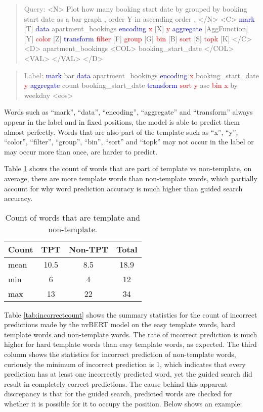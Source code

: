 \documentclass[
	a4paper, %
	10pt, %
	unnumberedsections, %
	twoside, %
]{t0003}
\newcommand{\blue}[1]{\textcolor{blue}{#1}}
\newcommand{\gray}[1]{\textcolor{gray}{#1}}
\newcommand{\red}[1]{\textcolor{red}{#1}}
\begin{document}
\begin{quote}
\gray{Query}: <N> Plot how many booking start date by grouped by booking start date as a bar graph , order Y in ascending order . </N> <C> \blue{mark} [T] \blue{data} apartment\_bookings \blue{ encoding} \red{x} [X] \red{y} \blue{aggregate} [AggFunction] [Y] \red{color} [Z] \blue{transform} \red{filter} [F] \red{group} [G] \red{bin} [B] \red{sort} [S] \red{topk} [K] </C> <D> apartment\_bookings <COL> booking\_start\_date </COL> <VAL> </VAL> </D>
\end{quote}

\begin{quote}
\gray{Label}: \blue{mark} bar \blue{data} apartment\_bookings \blue{encoding} \red{x} booking\_start\_date \red{y} \blue{aggregate} count booking\_start\_date \blue{transform} \red{sort} \red{y} asc \red{bin} \red{x} by weekday <eos>
\end{quote}

Words such as ``mark'', ``data'', ``encoding'', ``aggregate'' and ``transform'' always appear in the label and in fixed positions, the model is able to predict them almost perfectly. Words that are also part of the template such as ``x'', ``y'', ``color'', ``filter'', ``group'', ``bin'', ``sort'' and ``topk'' may not occur in the label or may occur more than once, are harder to predict.

Table \ref{tab:count} shows the count of words that are part of template vs non-template, on average, there are more template words than non-template words, which partially account for why word prediction accuracy is much higher than guided search accuracy.

\begin{table}
	\caption{Count of words that are template and non-template.}
	\centering
	\begin{tabular}{ lccc }
		\toprule
		Count & TPT & Non-TPT & Total \\
		\midrule
		mean & 10.5 & 8.5 & 18.9 \\
min & 6 & 4 & 12 \\
max & 13 & 22 & 34 \\
		\bottomrule
	\end{tabular}
	\label{tab:count}
\end{table}

Table \ref{tab:incorrectcount} shows the summary statistics for the count of incorrect predictions made by the nvBERT model on the easy template words, hard template words and non-template words. The rate of incorrect prediction is much higher for hard template words than easy template words, as expected. The third column shows the statistics for incorrect prediction of non-template words, curiously the minimum of incorrect prediction is 1, which indicates that every prediction has at least one incorrectly predicted word, yet the guided search did result in completely correct predictions. The cause behind this apparent discrepancy is that for the guided search, predicted words are checked for whether it is possible for it to occupy the position. Below shows an example:
\end{document}
